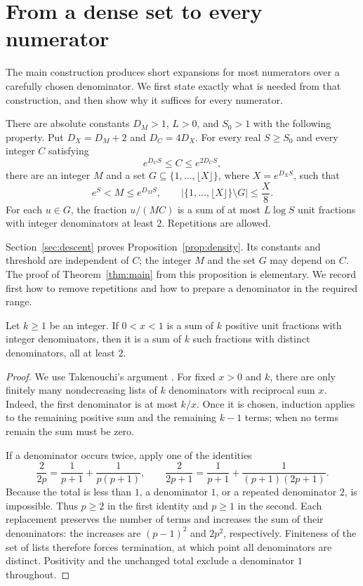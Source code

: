 \section{From a dense set to every numerator}\label{sec:elementary}

The main construction produces short expansions for most numerators over a
carefully chosen denominator.  We first state exactly what is needed from
that construction, and then show why it suffices for every numerator.

\begin{proposition}\label{prop:density}
There are absolute constants \(D_M>1\), \(L>0\), and \(S_0>1\) with the
following property.  Put \(D_X=D_M+2\) and \(D_C=4D_X\).
For every real \(S\ge S_0\) and every integer \(C\) satisfying
\[
 e^{D_CS}\le C\le e^{2D_CS},
\]
there are an integer \(M\) and a set
\(G\subseteq\{1,\ldots,\lfloor X\rfloor\}\), where \(X=e^{D_XS}\), such that
\[
 e^S<M\le e^{D_MS},
 \qquad
 \bigl|\{1,\ldots,\lfloor X\rfloor\}\setminus G\bigr|\le \frac X8.
\]
For each \(u\in G\), the fraction \(u/(MC)\) is a sum of at most
\(L\log S\) unit fractions with integer denominators at least \(2\).
Repetitions are allowed.
\end{proposition}

Section~\ref{sec:descent} proves Proposition~\ref{prop:density}.
Its constants and threshold are independent of \(C\); the integer \(M\)
and the set \(G\) may depend on \(C\).
The proof of Theorem~\ref{thm:main} from this proposition is elementary.
We record first how to remove repetitions and how to prepare a denominator
in the required range.

\begin{lemma}\label{lem:distinct}
Let \(k\ge1\) be an integer.  If \(0<x<1\) is a sum of \(k\) positive unit fractions with integer
denominators, then it is a sum of \(k\) such fractions with distinct
denominators, all at least \(2\).
\end{lemma}

\begin{proof}
We use Takenouchi's argument \cite[Sections~II--III, pp.~79--80]{Takenouchi1921}.
For fixed \(x>0\) and \(k\), there are only finitely many nondecreasing
lists of \(k\) denominators with reciprocal sum \(x\).
Indeed, the first denominator is at most \(k/x\).
Once it is chosen, induction applies to the remaining positive sum and
the remaining \(k-1\) terms; when no terms remain the sum must be zero.

If a denominator occurs twice, apply one of the identities
\[
 \frac2{2p}=\frac1{p+1}+\frac1{p(p+1)},
 \qquad
 \frac2{2p+1}=\frac1{p+1}+\frac1{(p+1)(2p+1)}.
\]
Because the total is less than \(1\), a denominator \(1\), or a repeated
denominator \(2\), is impossible.  Thus \(p\ge2\) in the first identity
and \(p\ge1\) in the second.  Each replacement preserves the number of
terms and increases the sum of their denominators: the increases are
\((p-1)^2\) and \(2p^2\), respectively.  Finiteness of the set of lists
therefore forces termination, at which point all denominators are
distinct.  Positivity and the unchanged total exclude a denominator
\(1\) throughout.
\end{proof}

